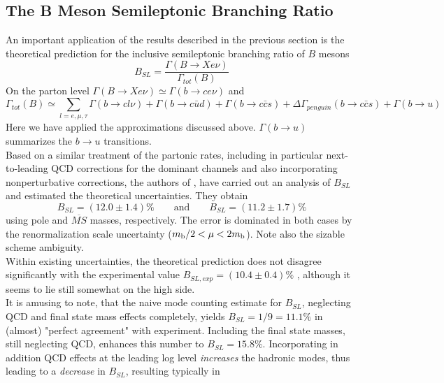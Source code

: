 \subsection{The B Meson Semileptonic Branching Ratio}
\label{sec:InclB:BSL}
An important application of the results described in the
previous section is the theoretical prediction for the inclusive
semileptonic branching ratio of $B$ mesons
\begin{equation}\label{bsldef}
B_{SL}=\frac{\Gamma(B\to Xe\nu)}{\Gamma_{tot}(B)}
\end{equation}
On the parton level $\Gamma(B\to Xe\nu)\simeq\Gamma(b\to ce\nu)$
and
\begin{equation}\label{gtotb}
\Gamma_{tot}(B)\simeq \sum_{l=e,\mu,\tau}\Gamma(b\to cl\nu)+
\Gamma(b\to c\bar ud)+\Gamma(b\to c\bar cs)+
\Delta\Gamma_{penguin}(b\to c\bar cs)+\Gamma(b\to u)
\end{equation}
Here we have applied the approximations discussed above. $\Gamma(b\to u)$
summarizes the $b\to u$ transitions.
\\
Based on a similar treatment of the partonic rates, including in
particular next-to-leading QCD corrections for the dominant channels
and also incorporating nonperturbative corrections, the authors of
\cite{baganetal:94b}, \cite{baganetal:95} have carried out an analysis
of $B_{SL}$ and estimated the theoretical uncertainties. They obtain
\cite{baganetal:95}
\begin{equation}\label{bslnum}
B_{SL} = (12.0 \pm 1.4)\%
\qquad \mbox{and} \qquad
B_{SL} = (11.2 \pm 1.7)\%
\end{equation}
using pole and $\overline{MS}$ masses, respectively. The error is
dominated in both cases by the renormalization scale uncertainty ($m_{\rm b}/2
< \mu < 2 m_{\rm b}$). Note also the sizable scheme ambiguity.
\\
Within existing uncertainties, the theoretical prediction does not disagree
significantly with the experimental value $B_{SL,exp}=(10.4\pm 0.4)\%$
\cite{particledata:94}, although it seems to lie still somewhat on the
high side.
\\
It is amusing to note, that the naive mode counting estimate for
$B_{SL}$, neglecting QCD and final state mass effects completely,
yields $B_{SL}=1/9=11.1\%$ in (almost) "perfect agreement" with
experiment. Including the final state masses, still neglecting QCD,
enhances this number to $B_{SL}=15.8\%$. Incorporating in addition QCD
effects at the leading log level {\it increases\/} the hadronic modes,
thus leading to a {\it decrease\/} in $B_{SL}$, resulting typically in
